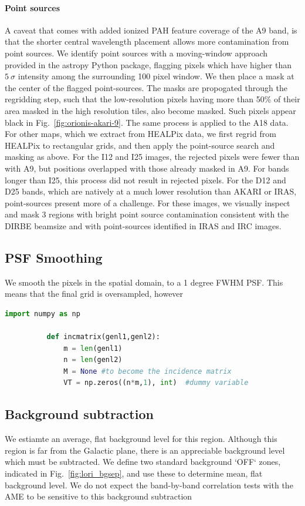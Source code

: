         \paragraph{Point sources}
          A caveat that comes with added ionized PAH feature coverage of the A9 band, is that the shorter central wavelength placement allows more contamination from point sources. We identify point sources with a moving-window approach provided in the astropy Python package, flagging pixels which have higher than $5~\sigma$ intensity among the surrounding 100 pixel window. We then place a mask at the center of the flagged point-sources. The masks are propogated through the regridding step, such that the low-resolution pixels having more than 50\% of their area masked in the high resolution tiles, also become masked. Such pixels appear black in Fig.~\ref{fig:orionis-akari-9}. The same process is applied to the A18 data. For other maps, which we extract from HEALPix data, we first regrid from HEALPix to rectangular grids, and then apply the point-source search and masking as above. For the I12 and I25 images, the rejected pixels were fewer than with A9, but positions overlapped with those already masked in A9. For bands longer than I25, this process did not result in rejected pixels. For the D12 and D25 bands, which are natively at a much lower resolution than AKARI or IRAS, point-sources present more of a challenge. For these images, we visually inspect and mask 3 regions with bright point source contamination consistent with the DIRBE beamsize and with point-sources identified in IRAS and IRC images.


      \subsection{PSF Smoothing}
        We smooth the pixels in the spatial domain, to a 1 degree FWHM PSF. This means that the final grid is oversampled, however
        \begin{lstlisting}[language=Python]
          import numpy as np

          def incmatrix(genl1,genl2):
              m = len(genl1)
              n = len(genl2)
              M = None #to become the incidence matrix
              VT = np.zeros((n*m,1), int)  #dummy variable
        \end{lstlisting}

      \subsection{Background subtraction}
         We estiamte an average, flat background level for this region. Although this region is far from the Galactic plane, there is an appreciable background level which must be subtracted. We define two standard background `OFF` zones, indicated in Fig.~\ref{fig:lori_bgsep}, and use these to determine mean, flat background level. We do not expect the band-by-band correlation tests with the AME to be sensitive to this background subtraction

